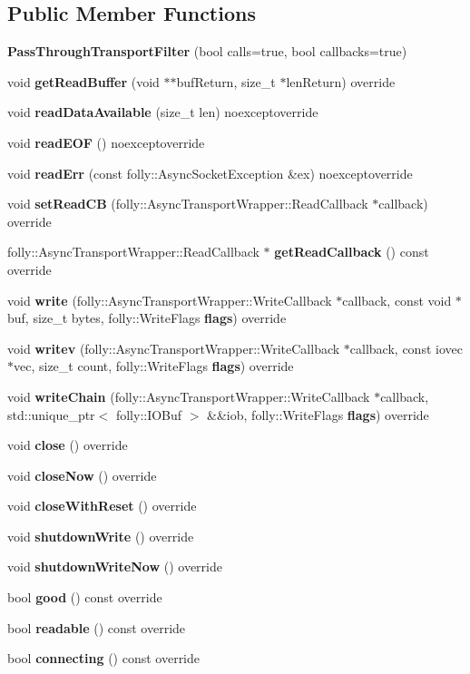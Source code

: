 \subsection*{Public Member Functions}
\begin{DoxyCompactItemize}
\item 
{\bf Pass\+Through\+Transport\+Filter} (bool calls=true, bool callbacks=true)
\item 
void {\bf get\+Read\+Buffer} (void $\ast$$\ast$buf\+Return, size\+\_\+t $\ast$len\+Return) override
\item 
void {\bf read\+Data\+Available} (size\+\_\+t len) noexceptoverride
\item 
void {\bf read\+E\+OF} () noexceptoverride
\item 
void {\bf read\+Err} (const folly\+::\+Async\+Socket\+Exception \&ex) noexceptoverride
\item 
void {\bf set\+Read\+CB} (folly\+::\+Async\+Transport\+Wrapper\+::\+Read\+Callback $\ast$callback) override
\item 
folly\+::\+Async\+Transport\+Wrapper\+::\+Read\+Callback $\ast$ {\bf get\+Read\+Callback} () const override
\item 
void {\bf write} (folly\+::\+Async\+Transport\+Wrapper\+::\+Write\+Callback $\ast$callback, const void $\ast$buf, size\+\_\+t bytes, folly\+::\+Write\+Flags {\bf flags}) override
\item 
void {\bf writev} (folly\+::\+Async\+Transport\+Wrapper\+::\+Write\+Callback $\ast$callback, const iovec $\ast$vec, size\+\_\+t count, folly\+::\+Write\+Flags {\bf flags}) override
\item 
void {\bf write\+Chain} (folly\+::\+Async\+Transport\+Wrapper\+::\+Write\+Callback $\ast$callback, std\+::unique\+\_\+ptr$<$ folly\+::\+I\+O\+Buf $>$ \&\&iob, folly\+::\+Write\+Flags {\bf flags}) override
\item 
void {\bf close} () override
\item 
void {\bf close\+Now} () override
\item 
void {\bf close\+With\+Reset} () override
\item 
void {\bf shutdown\+Write} () override
\item 
void {\bf shutdown\+Write\+Now} () override
\item 
bool {\bf good} () const override
\item 
bool {\bf readable} () const override
\item 
bool {\bf connecting} () const override
\item 
$$
\end{DoxyCompactItemize}
